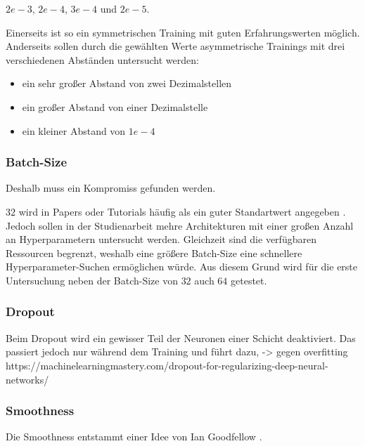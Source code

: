 \begin{center} \(2e-3\), \(2e-4\), \(3e-4\) und \(2e-5\). \end{center}

Einerseits ist so ein symmetrischen Training mit guten Erfahrungswerten möglich.
Anderseits sollen durch die gewählten Werte asymmetrische Trainings mit drei verschiedenen Abständen untersucht werden:
\begin{itemize}
	\item ein sehr großer Abstand von zwei Dezimalstellen
	\item ein großer Abstand von einer Dezimalstelle
	\item ein kleiner Abstand von \(1e-4\)
\end{itemize}	

\subsubsection{Batch-Size}

Deshalb muss ein Kompromiss gefunden werden.
\newline

\(32\) wird in Papers oder Tutorials häufig als ein guter Standartwert angegeben \cite{default-batch-size}.
Jedoch sollen in der Studienarbeit mehre Architekturen mit einer großen Anzahl an Hyperparametern untersucht werden.
Gleichzeit sind die verfügbaren Ressourcen begrenzt, weshalb eine größere Batch-Size eine schnellere Hyperparameter-Suchen ermöglichen würde.
Aus diesem Grund wird für die erste Untersuchung neben der Batch-Size von \(32\) auch \(64\) getestet.

\subsubsection{Dropout}
Beim Dropout wird ein gewisser Teil der Neuronen einer Schicht deaktiviert.
Das passiert jedoch nur während dem Training und führt dazu, -> gegen overfitting
https://machinelearningmastery.com/dropout-for-regularizing-deep-neural-networks/



\subsubsection{Smoothness}
Die Smoothness entstammt einer Idee von Ian Goodfellow \cite{ian-goodfellow-onesided-label-smoothing}.
\newline

